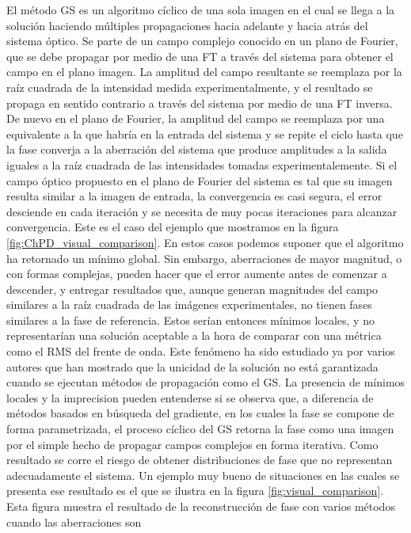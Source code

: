 El método GS es un algoritmo cíclico de una sola imagen en el cual se
llega a la solución haciendo múltiples propagaciones hacia adelante y hacia atrás
del sistema óptico. Se parte de un campo complejo conocido en un plano
de Fourier, que se debe propagar por medio de una FT a través del
sistema para obtener el campo en el plano imagen. La amplitud del
campo resultante se reemplaza por la raíz cuadrada de la intensidad
medida experimentalmente, y el resultado se propaga en sentido
contrario a través del sistema por medio de una FT inversa. De nuevo
en el plano de Fourier, la amplitud del campo se reemplaza por una
equivalente a la que habría en la entrada del sistema y se repite el
ciclo hasta que la fase converja a la aberración del sistema que
produce amplitudes a la salida iguales a la raíz cuadrada de las
intensidades tomadas experimentalemente. 
Si el campo óptico propuesto en el plano de
Fourier del sistema es tal que su imagen resulta similar a la imagen
de entrada, la convergencia es casi segura, el error desciende en cada
iteración y se necesita de muy pocas
iteraciones para alcanzar convergencia. Este es el caso del ejemplo
que mostramos en la figura \ref{fig:ChPD_visual_comparison}. En estos
casos podemos suponer que el algoritmo ha retornado un mínimo
global. Sin embargo, aberraciones de mayor magnitud, o con formas
complejas, pueden hacer que el error aumente antes de comenzar a
descender, y entregar resultados que, aunque generan magnitudes del
campo similares a la raíz cuadrada de las imágenes experimentales, no
tienen fases similares a la fase de referencia.  Estos serían entonces
mínimos locales, y no representarían una solución aceptable a la hora
de comparar con una métrica como el RMS del frente de onda. Este
fenómeno ha sido estudiado ya por varios autores
 que han mostrado que la unicidad
de la solución no está garantizada cuando se ejecutan métodos de
propagación como el GS.  
La presencia de mínimos locales y la
imprecision pueden entenderse si se observa 
que, a diferencia de métodos basados en búsqueda del gradiente, en los
cuales la fase se compone de forma parametrizada, el proceso cíclico
del GS retorna la fase como una imagen por el simple hecho de propagar campos complejos
en forma iterativa. Como resultado se corre el riesgo de obtener distribuciones
de fase que no representan adecuadamente el sistema.  Un ejemplo muy bueno de situaciones en las
cuales se presenta ese resultado es el que se ilustra en la figura
\ref{fig:visual_comparison}. Esta figura muestra el resultado de la
reconstrucción de fase con varios métodos cuando las aberraciones son
